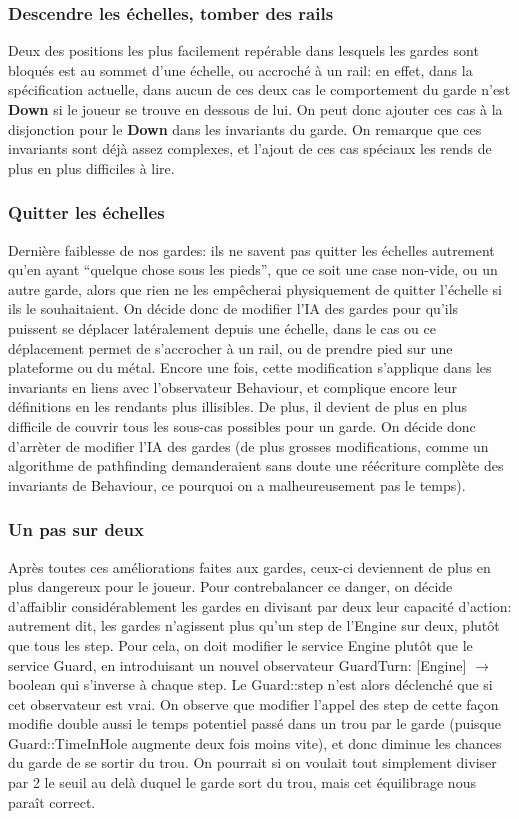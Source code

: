 \documentclass{article}
\begin{document}
\subsubsection{Descendre les échelles, tomber des rails}
Deux des positions les plus facilement repérable dans lesquels les gardes sont bloqués est au sommet d'une échelle, ou accroché à un rail: en effet, dans la spécification actuelle, dans aucun de ces deux cas le comportement du garde n'est \textbf{Down} si le joueur se trouve en dessous de lui. On peut donc ajouter ces cas à la disjonction pour le \textbf{Down} dans les invariants du garde. On remarque que ces invariants sont déjà assez complexes, et l'ajout de ces cas spéciaux les rends de plus en plus difficiles à lire.

\subsubsection{Quitter les échelles}
Dernière faiblesse de nos gardes: ils ne savent pas quitter les échelles autrement qu'en ayant ``quelque chose sous les pieds'', que ce soit une case non-vide, ou un autre garde, alors que rien ne les empêcherai physiquement de quitter l'échelle si ils le souhaitaient. On décide donc de modifier l'IA des gardes pour qu'ils puissent se déplacer latéralement depuis une échelle, dans le cas ou ce déplacement permet de s'accrocher à un rail, ou de prendre pied sur une plateforme ou du métal. Encore une fois, cette modification s'applique dans les invariants en liens avec l'observateur \textrm{Behaviour}, et complique encore leur définitions en les rendants plus illisibles. De plus, il devient de plus en plus difficile de couvrir tous les sous-cas possibles pour un garde. On décide donc d'arrèter de modifier l'IA des gardes (de plus grosses modifications, comme un algorithme de pathfinding demanderaient sans doute une réécriture complète des invariants de \textrm{Behaviour}, ce pourquoi on a malheureusement pas le temps).

\subsubsection{Un pas sur deux}
Après toutes ces améliorations faites aux gardes, ceux-ci deviennent de plus en plus dangereux pour le joueur. Pour contrebalancer ce danger, on décide d'affaiblir considérablement les gardes en divisant par deux leur capacité d'action: autrement dit, les gardes n'agissent plus qu'un \textrm{step} de l'\textrm{Engine} sur deux, plutôt que tous les \textrm{step}. Pour cela, on doit modifier le service \textrm{Engine} plutôt que le service \textrm{Guard}, en introduisant un nouvel observateur \textrm{GuardTurn: [Engine] $\rightarrow$ boolean} qui s'inverse à chaque \textrm{step}. Le \textrm{Guard::step} n'est alors déclenché que si cet observateur est vrai. On observe que modifier l'appel des \textrm{step} de cette façon modifie double aussi le temps potentiel passé dans un trou par le garde (puisque \textrm{Guard::TimeInHole} augmente deux fois moins vite), et donc diminue les chances du garde de se sortir du trou. On pourrait si on voulait tout simplement diviser par 2 le seuil au delà duquel le garde sort du trou, mais cet équilibrage nous paraît correct.
\end{document}
